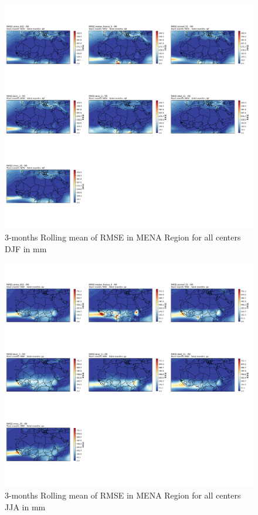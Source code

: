 \begin{figure}[H]
\centering
\includegraphics[scale=0.3]{plots/det/rmse/rmse_djf_RR.png}
\caption{3-months Rolling mean of RMSE in MENA Region for all centers DJF in mm}
\end{figure}

\begin{figure}[H]
\centering
\includegraphics[scale=0.3]{plots/det/rmse/rmse_jja_RR.png}
\caption{3-months Rolling mean of RMSE in MENA Region for all centers JJA in mm}
\end{figure}

